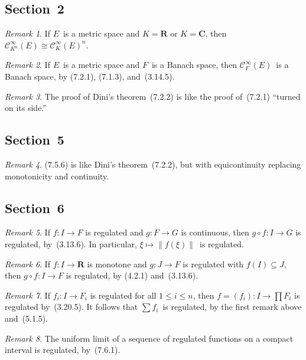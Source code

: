 \documentclass[letterpaper,12pt]{article}
\newcommand{\R}{\mathbf{R}}
\newcommand{\C}{\mathbf{C}}
\newcommand{\BC}{\mathcal{C}^{\infty}}
\newcommand{\after}{\circ}
\newcommand{\iso}{\cong}
\newcommand{\norm}[1]{\lVert{#1}\rVert}
\theoremstyle{plain}
\theoremstyle{definition}
\theoremstyle{remark}
\newtheorem*{rmk}{Remark}
\begin{document}
\subsection*{Section~2}
\begin{rmk}
If \(E\)~is a metric space and \(K=\R\) or \(K=\C\), then \(\BC_{K^n}(E)\iso\BC_K(E)^n\).
\end{rmk}

\begin{rmk}
If \(E\)~is a metric space and \(F\)~is a Banach space, then \(\BC_F(E)\)~is a Banach space, by (7.2.1), (7.1.3), and~(3.14.5).
\end{rmk}

\begin{rmk}
The proof of Dini's theorem~(7.2.2) is like the proof of~(7.2.1) ``turned on its side.''
\end{rmk}

\subsection*{Section~5}
\begin{rmk}
(7.5.6) is like Dini's theorem~(7.2.2), but with equicontinuity replacing monotonicity and continuity.
\end{rmk}

\subsection*{Section~6}
\begin{rmk}
If \(f:I\to F\) is regulated and \(g:F\to G\) is continuous, then \(g\after f:I\to G\) is regulated, by~(3.13.6). In particular, \(\xi\mapsto\norm{f(\xi)}\)~is regulated.
\end{rmk}

\begin{rmk}
If \(f:I\to\R\) is monotone and \(g:J\to F\) is regulated with \(f(I)\subseteq J\), then \(g\after f:I\to F\) is regulated, by (4.2.1) and~(3.13.6).
\end{rmk}

\begin{rmk}
If \(f_i:I\to F_i\) is regulated for all \(1\le i\le n\), then \(f=(f_i):I\to\prod F_i\) is regulated by~(3.20.5). It follows that \(\sum f_i\)~is regulated, by the first remark above and~(5.1.5).
\end{rmk}

\begin{rmk}
The uniform limit of a sequence of regulated functions on a compact interval is regulated, by~(7.6.1).
\end{rmk}
\end{document}
